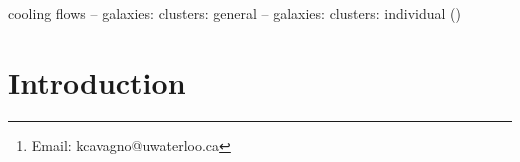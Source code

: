 \documentclass[useAMS,usenatbib]{mn2e}
\title[\mystitle]{\mytitle}
\author[Cavagnolo et al.]{K. Cavagnolo$^{1}$\thanks{Email:
    kcavagno@uwaterloo.ca}, M. Donahue$^{2}$, B. McNamara$^{1,3,4}$,
  G. M. Voit$^{2}$, and M. Sun$^{3}$\\
$^{1}$Department of Physics and Astronomy, University of Waterloo,
Waterloo, ON N2L 3G1, Canada.\\
$^{2}$Department of Physics and Astronomy, Michigan State University,
East Lansing, MI, 48824-2320, USA.\\
$^{3}$Perimeter Institute for Theoretical Physics, 31 Caroline St. N.,
Waterloo, Ontario, N2L 2Y5, Canada\\
$^{4}$Harvard-Smithsonian Center for Astrophysics, 60 Garden Street,
Cambridge, MA 02138, USA\\
$^{5}$Department of Astronomy, University of Virginia,
Charlottesville, VA, 22904, USA.}
\begin{document}
\date{Accepted 2010 Month DD. Received 2010 Month DD; in original form 2010 Month DD}

\pagerange{\pageref{firstpage}--\pageref{lastpage}} 

\maketitle

\label{firstpage}


\begin{abstract}
\end{abstract}


\begin{keywords}
cooling flows -- galaxies: clusters: general -- galaxies:
  clusters: individual (\iras)
\end{keywords}

\section{Introduction}
\label{sec:intro}
\end{document}
